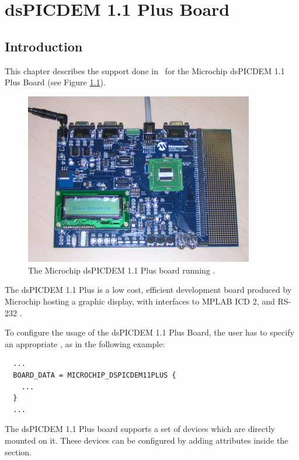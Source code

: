 \chapter[dsPICDEM 1.1 Plus Board]{dsPICDEM 1.1 Plus Board}

\section{Introduction}

This chapter describes the support done in \ee\ for the
Microchip dsPICDEM 1.1 Plus Board (see Figure \ref{fig:dspicdem}).

\begin{figure}
  \begin{center}
    \includegraphics[width=10cm, bb=0 0 1600 1200]{images/dspicdemrunning.jpg}
  \end{center}
  \caption{The Microchip dsPICDEM 1.1 Plus board running \ee.}
  \label{fig:dspicdem}
\end{figure}

The dsPICDEM 1.1 Plus is a low cost, efficient development board
produced by Microchip hosting a graphic display, with interfaces to
MPLAB ICD 2, and RS-232 \cite{dsPICDEM}.

To configure the usage of the dsPICDEM 1.1 Plus Board, the user has to
specify an appropriate , as in the following
example:

\begin{lstlisting}
  ...
  BOARD_DATA = MICROCHIP_DSPICDEM11PLUS {
    ...
  }
  ...
\end{lstlisting}

The dsPICDEM 1.1 Plus board supports a set of devices which are directly
mounted on it. These devices can be configured by adding attributes
inside the  section.

